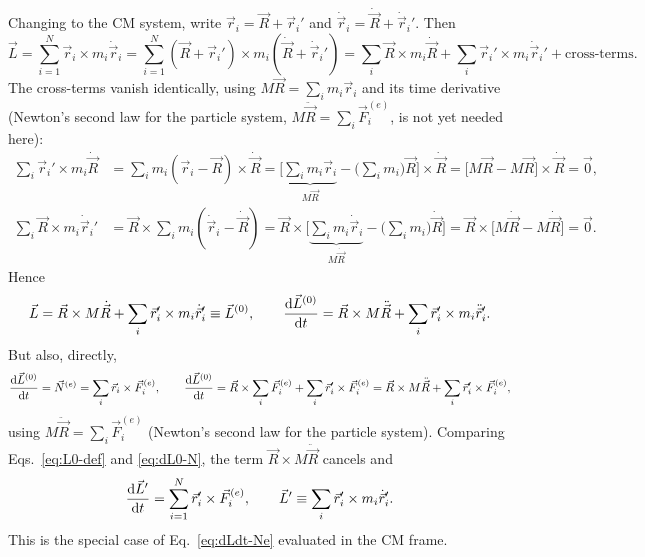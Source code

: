 \documentclass[11pt]{article}
\begin{document}
Changing to the CM system, write $\vec r_i = \vec R+\vec r_i'$ and $\dot{\vec r}_i = \dot{\vec R}+\dot{\vec r}_i'$. Then
\begin{equation}
\vec L = \sum_{i=1}^N \vec r_i\times m_i\dot{\vec r}_i = \sum_{i=1}^N (\vec R+\vec r_i')\times m_i(\dot{\vec R}+\dot{\vec r}_i')
= \sum_i \vec R\times m_i\dot{\vec R} + \sum_i \vec r_i'\times m_i\dot{\vec r}_i' + \text{cross-terms}.
\label{eq:L-expand}
\end{equation}
The cross-terms vanish identically, using $M\vec R=\sum_i m_i\vec r_i$ and its time derivative (Newton's second law for the particle system, $M\ddot{\vec R}=\sum_i \vec F_i^{(e)}$, is not yet needed here):
\begin{align}
\sum_i \vec r_i'\times m_i\dot{\vec R} &= \sum_i m_i(\vec r_i-\vec R)\times\dot{\vec R} = \Big[\underbrace{\sum_i m_i\vec r_i}_{M\vec R} - \Big(\sum_i m_i\Big)\vec R\Big]\times\dot{\vec R} = \big[M\vec R - M\vec R\big]\times\dot{\vec R} = \vec 0,\\
\sum_i \vec R\times m_i\dot{\vec r}_i' &= \vec R\times\sum_i m_i(\dot{\vec r}_i-\dot{\vec R}) = \vec R\times\Big[\underbrace{\sum_i m_i\dot{\vec r}_i}_{M\dot{\vec R}} - \Big(\sum_i m_i\Big)\dot{\vec R}\Big] = \vec R\times\big[M\dot{\vec R}-M\dot{\vec R}\big] = \vec 0.
\end{align}
Hence
\begin{equation}
\vec L = \vec R\times M\dot{\vec R} + \sum_i \vec r_i'\times m_i\dot{\vec r}_i' \equiv \vec L^{(0)}, \qquad
\frac{\mathrm{d} \vec L^{(0)}}{\mathrm{d} t} = \vec R\times M\ddot{\vec R} + \sum_i \vec r_i'\times m_i\ddot{\vec r}_i'.
\label{eq:L0-def}
\end{equation}
But also, directly,
\begin{equation}
\frac{\mathrm{d} \vec L^{(0)}}{\mathrm{d} t} = \vec N^{(e)} = \sum_i \vec r_i\times \vec F_i^{(e)}, \qquad
\frac{\mathrm{d} \vec L^{(0)}}{\mathrm{d} t} = \vec R\times\sum_i \vec F_i^{(e)} + \sum_i \vec r_i'\times \vec F_i^{(e)} = \vec R\times M\ddot{\vec R}+\sum_i \vec r_i'\times \vec F_i^{(e)},
\label{eq:dL0-N}
\end{equation}
using $M\ddot{\vec R}=\sum_i \vec F_i^{(e)}$ (Newton's second law for the particle system). Comparing Eqs.~\eqref{eq:L0-def} and \eqref{eq:dL0-N}, the term $\vec R\times M\ddot{\vec R}$ cancels and
\begin{equation}
\frac{\mathrm{d} \vec L'}{\mathrm{d} t} = \sum_{i=1}^N \vec r_i'\times \vec F_i^{(e)}, \qquad \vec L'\equiv\sum_i \vec r_i'\times m_i\dot{\vec r}_i'.
\label{eq:dLprime}
\end{equation}
This is the special case of Eq.~\eqref{eq:dLdt-Ne} evaluated in the CM frame.
\end{document}
